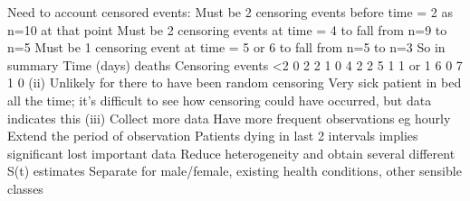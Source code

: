 \documentclass[a4paper,12pt]{article}
\begin{document}
Need to account censored events:
Must be 2 censoring events before time = 2 as n=10 at that point 
Must be 2 censoring events at time = 4 to fall from n=9 to n=5 
Must be 1 censoring event at time = 5 or 6 to fall from n=5 to n=3 
So in summary
Time (days)
deaths
Censoring events
<2
0
2
2
1
0
4
2
2
5
1
1 or
1
6
0
7
1
0
(ii)
Unlikely for there to have been random censoring 
Very sick patient in bed all the time; it’s difficult to see how censoring could have occurred, but data indicates this 
(iii)
Collect more data 
Have more frequent observations eg hourly 
Extend the period of observation 
Patients dying in last 2 intervals implies significant lost important data 
Reduce heterogeneity and obtain several different S(t) estimates 
Separate for male/female, existing health conditions, other sensible classes 
\end{document}
